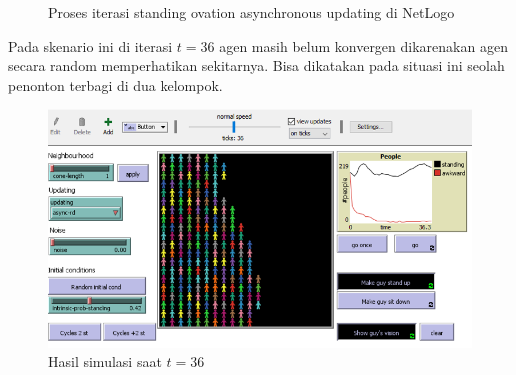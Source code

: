 \begin{itemize}
	\begin{figure}[H]
		\centering
		\hfill
		\hfill
		\hfill
		\caption{Proses iterasi standing ovation asynchronous updating di NetLogo}
		\label{fig:proses_sop_async}
	\end{figure}

	Pada skenario ini di iterasi $t=36$ agen masih belum konvergen dikarenakan agen secara random memperhatikan sekitarnya. Bisa dikatakan pada situasi ini seolah penonton terbagi di dua kelompok.

	\begin{figure}[H]
	\centering
	\includegraphics[width=\linewidth]{images/ch03/sop8}
	\caption{Hasil simulasi saat $t=36$}
	\label{fig:sop8}
	\end{figure}


\end{itemize}
